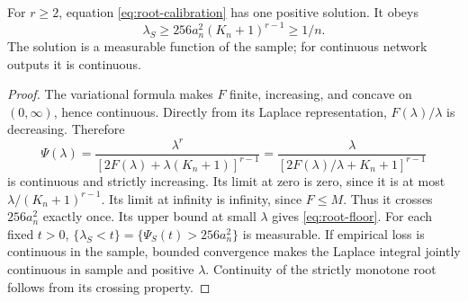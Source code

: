 \begin{lemma}
\label{lem:root}
For $r\ge2$, equation \eqref{eq:root-calibration} has one positive solution. It obeys
\begin{equation}
 \lambda_S\ge256a_n^2(K_n+1)^{r-1}\ge1/n.
 \label{eq:root-floor}
\end{equation}
The solution is a measurable function of the sample; for continuous network outputs it is continuous.
\end{lemma}
\begin{proof}
The variational formula makes $F$ finite, increasing, and concave on $(0,\infty)$, hence continuous. Directly from its Laplace representation, $F(\lambda)/\lambda$ is decreasing. Therefore
\[
 \Psi(\lambda)=\frac{\lambda^r}{[2F(\lambda)+\lambda(K_n+1)]^{r-1}}
 =\frac{\lambda}{[2F(\lambda)/\lambda+K_n+1]^{r-1}}
\]
is continuous and strictly increasing. Its limit at zero is zero, since it is at most $\lambda/(K_n+1)^{r-1}$. Its limit at infinity is infinity, since $F\le M$. Thus it crosses $256a_n^2$ exactly once. Its upper bound at small $\lambda$ gives \eqref{eq:root-floor}.
For each fixed $t>0$, $\{\lambda_S<t\}=\{\Psi_S(t)>256a_n^2\}$ is measurable. If empirical loss is continuous in the sample, bounded convergence makes the Laplace integral jointly continuous in sample and positive $\lambda$. Continuity of the strictly monotone root follows from its crossing property.
\end{proof}

